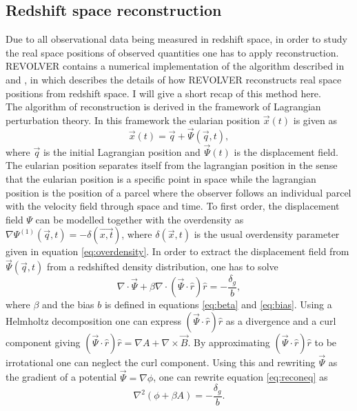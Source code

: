 \subsection{Redshift space reconstruction}\label{sec:reconstruction}
Due to all observational data being measured in redshift space, in order to study
the real space positions of observed quantities one has to apply reconstruction. REVOLVER contains a numerical implementation of
the algorithm described in \cite{Nadathur_2018} and \cite{Burden_reconstruction}, in which describes the details
of how REVOLVER reconstructs real space positions from redshift space. I will give a
short recap of this method here.\\\indent
The algorithm of reconstruction is derived in the framework of Lagrangian
perturbation theory. In this framework the eularian position $\vec{x}(t)$ is
given as
\begin{equation}
    \vec{x}(t)=\vec{q}+\vec{\Psi}(\vec{q},t),
\end{equation}
where $\vec{q}$ is the initial Lagrangian position and $\vec{\Psi}(t)$ is the
displacement field. The eularian position separates itself from the lagrangian
position in the sense that the eularian position is a specific point in space
while the lagrangian position is the position of a parcel where the observer
follows an individual parcel with the velocity field through space and time.
To first order, the displacement field $\Psi$ can be modelled together with the
overdensity as $\nabla\Psi^{(1)}(\vec{q},t)=-\delta(\vec{x,t})$, where
$\delta(\vec{x},t)$ is the usual overdensity parameter given in equation \ref{eq:overdensity}.
In order to extract the displacement field from $\vec{\Psi}(\vec{q},t)$ from a
redshifted density distribution, one has to solve \cite{recondisplace}
\begin{equation}\label{eq:reconeq}
    \nabla\cdot\vec{\Psi}+\beta\nabla\cdot(\vec{\Psi}\cdot\hat{r})\hat{r}=-\frac{\delta_g}{b},
\end{equation}
where $\beta$ and the bias $b$ is defined in equations
\ref{eq:beta} and \ref{eq:bias}. Using a Helmholtz decomposition one can
express $(\vec{\Psi}\cdot\hat{r})\hat{r}$ as a divergence and a curl component giving $(\vec{\Psi}\cdot\hat{r})\hat{r}=\nabla A + \nabla \times \vec{B}$.
By approximating $(\vec{\Psi}\cdot\hat{r})\hat{r}$ to be irrotational one can neglect
the curl component.
Using this and rewriting $\vec{\Psi}$ as the gradient of a
potential $\vec{\Psi}=\nabla\phi$, one can rewrite equation \ref{eq:reconeq} as
\begin{equation}
    \nabla^2(\phi+\beta A)=-\frac{\delta_g}{b}.
\end{equation}
